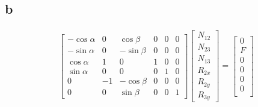 \documentclass[11pt]{article}
\numberwithin{equation}{section}
\begin{document}
\subsection{b}
\begin{gather}
    \begin{bmatrix}
        -\cos \alpha & 0 & \cos \beta & 0 & 0 & 0\\
        -\sin \alpha & 0 & -\sin \beta & 0 & 0 &0\\
        \cos \alpha & 1 & 0 & 1 & 0 & 0\\
        \sin \alpha & 0 & 0& 0 & 1 & 0\\
        0 & -1 & -\cos \beta & 0 & 0 & 0\\
        0 & 0 & \sin \beta & 0 & 0 & 1
    \end{bmatrix} \begin{bmatrix}
        N_{12}\\
        N_{23}\\
        N_{13}\\
        R_{2x}\\
        R_{2y}\\
        R_{3y}        
    \end{bmatrix} = \begin{bmatrix}
        0\\
        F\\
        0\\
        0\\
        0\\
        0\\
    \end{bmatrix}
\end{gather}
\end{document}
